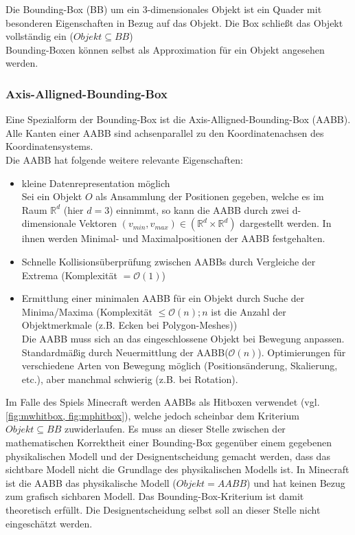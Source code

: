 Die Bounding-Box (BB) um ein 3-dimensionales Objekt ist ein Quader mit besonderen Eigenschaften in Bezug auf das Objekt. Die Box schließt das Objekt vollständig ein ($Objekt \subseteq BB$)\\
Bounding-Boxen können selbst als Approximation für ein Objekt angesehen werden.\\
\subsubsection{Axis-Alligned-Bounding-Box}
Eine Spezialform der Bounding-Box ist die Axis-Alligned-Bounding-Box (AABB). Alle Kanten einer AABB sind achsenparallel zu den Koordinatenachsen des Koordinatensystems.\\
Die AABB hat folgende weitere relevante Eigenschaften:
\begin{itemize}
	\item kleine Datenrepresentation möglich\\
		Sei ein Objekt $O$ als Ansammlung der Positionen gegeben, welche es im Raum $\mathbb{R}^d$ (hier $d=3$) einnimmt, so kann die AABB durch zwei d-dimensionale Vektoren $(v_{min}, v_{max}) \in (\mathbb{R}^{d}\times\mathbb{R}^{d})$ dargestellt werden. In ihnen werden Minimal- und Maximalpositionen der AABB festgehalten.
	\item Schnelle Kollisionsüberprüfung zwischen AABBs durch Vergleiche der Extrema (Komplexität $= \mathcal{O}(1)$)
	\item Ermittlung einer minimalen AABB für ein Objekt durch Suche der Minima/Maxima (Komplexität $\le \mathcal{O}(n); n $ ist die Anzahl der Objektmerkmale (z.B. Ecken bei Polygon-Meshes))\\
		Die AABB muss sich an das eingeschlossene Objekt bei Bewegung anpassen. Standardmäßig durch Neuermittlung der AABB($\mathcal{O}(n)$). Optimierungen für verschiedene Arten von Bewegung möglich (Positionsänderung, Skalierung, etc.), aber manchmal schwierig (z.B. bei Rotation).
\end{itemize}

Im Falle des Spiels Minecraft werden AABBs als Hitboxen verwendet (vgl. \ref{fig:mwhitbox, fig:mphitbox}), welche jedoch scheinbar dem Kriterium $Objekt \subseteq BB$ zuwiderlaufen. Es muss an dieser Stelle zwischen der mathematischen Korrektheit einer Bounding-Box gegenüber einem gegebenen physikalischen Modell und der Designentscheidung gemacht werden, dass das sichtbare Modell nicht die Grundlage des physikalischen Modells ist. In Minecraft ist die AABB das physikalische Modell ($Objekt = AABB$) und hat keinen Bezug zum grafisch sichbaren Modell. Das Bounding-Box-Kriterium ist damit theoretisch erfüllt. Die Designentscheidung selbst soll an dieser Stelle nicht eingeschätzt werden.

